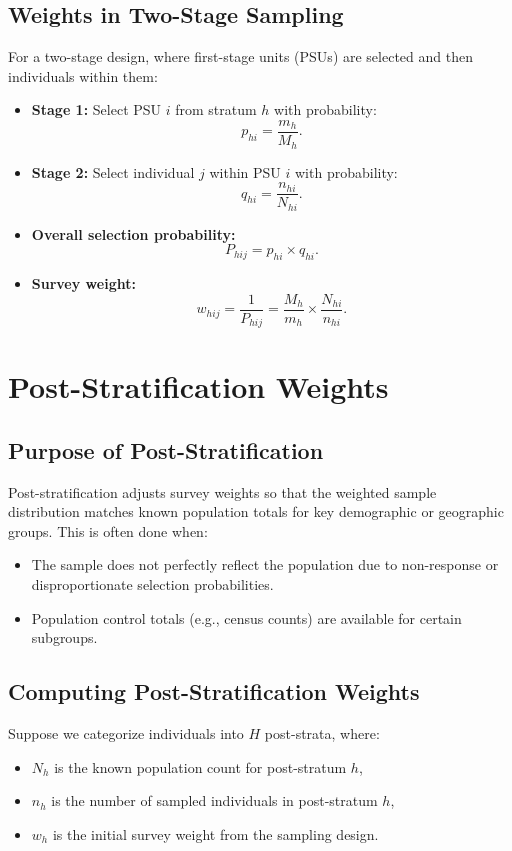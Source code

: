 \documentclass[12pt]{article}
\begin{document}
\subsection{Weights in Two-Stage Sampling}
For a two-stage design, where first-stage units (PSUs) are selected and then individuals within them:

\begin{itemize}
    \item \textbf{Stage 1:} Select PSU \( i \) from stratum \( h \) with probability:
    \[
    p_{hi} = \frac{m_h}{M_h}.
    \]
    \item \textbf{Stage 2:} Select individual \( j \) within PSU \( i \) with probability:
    \[
    q_{hi} = \frac{n_{hi}}{N_{hi}}.
    \]
    \item \textbf{Overall selection probability:}
    \[
    P_{hij} = p_{hi} \times q_{hi}.
    \]
    \item \textbf{Survey weight:}
    \[
    w_{hij} = \frac{1}{P_{hij}} = \frac{M_h}{m_h} \times \frac{N_{hi}}{n_{hi}}.
    \]
\end{itemize}

\section{Post-Stratification Weights}

\subsection{Purpose of Post-Stratification}
Post-stratification adjusts survey weights so that the weighted sample distribution matches known population totals for key demographic or geographic groups. This is often done when:

\begin{itemize}
    \item The sample does not perfectly reflect the population due to non-response or disproportionate selection probabilities.
    \item Population control totals (e.g., census counts) are available for certain subgroups.
\end{itemize}

\subsection{Computing Post-Stratification Weights}

Suppose we categorize individuals into \( H \) post-strata, where:
\begin{itemize}
    \item \( N_h \) is the known population count for post-stratum \( h \),
    \item \( n_h \) is the number of sampled individuals in post-stratum \( h \),
    \item \( w_h \) is the initial survey weight from the sampling design.
\end{itemize}
\end{document}
